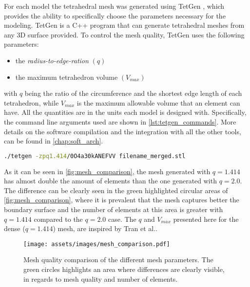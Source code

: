 For each model the tetrahedral mesh was generated using TetGen \cite{tetgen}, which provides the ability to specifically choose the parameters necessary for the modeling. TetGen \cite{tetgen} is a C++ program that can generate tetrahedral meshes from any 3D surface provided. To control the mesh quality, TetGen \cite{tetgen} uses the following parameters:
\begin{itemize}
	\item the \textit{radius-to-edge-ration} $(q)$
	\item the maximum tetrahedron volume $(V_{max})$
\end{itemize}
with $q$ being the ratio of the circumference and the shortest edge length of each tetrahedron, while $V_{max}$ is the maximum allowable volume that an element can have. All the quantities are in the units each model is designed with. Specifically, the command line arguments used are shown in \autoref{lst:tetgen_commands}. More details on the software compilation and the integration with all the other tools, can be found in \autoref{chap:soft_arch}.

\begin{lstlisting}[language=bash,caption={Command to run TetGen},captionpos=b, label=lst:tetgen_commands]
	./tetgen -zpq1.414/0O4a30kANEFVV filename_merged.stl
\end{lstlisting}

As it can be seen in \autoref{fig:mesh_comparison}, the mesh generated with $q = 1.414$ has almost double the amount of elements than the one generated with $q = 2.0$. The difference can be clearly seen in the green highlighted circular areas of \autoref{fig:mesh_comparison}, where it is prevalent that the mesh captures better the boundary surface and the number of elements at this area is greater with $q = 1.414$ compared to the $q = 2.0$ case. The $q$ and $V_{max}$ presented here for the dense ($q=1.414$) mesh, are inspired by Tran et al.\cite{Tran2020}.

\begin{figure}[H]
    \centering
    \texttt{[image: assets/images/mesh\_comparison.pdf]}
    \caption[Mesh quality comparison for the different $q$ parameters.]{Mesh quality comparison of the different mesh parameters. The green circles highlights an area where differences are clearly visible, in regards to mesh quality and number of elements.}
    \label{fig:mesh_comparison}
\end{figure}

